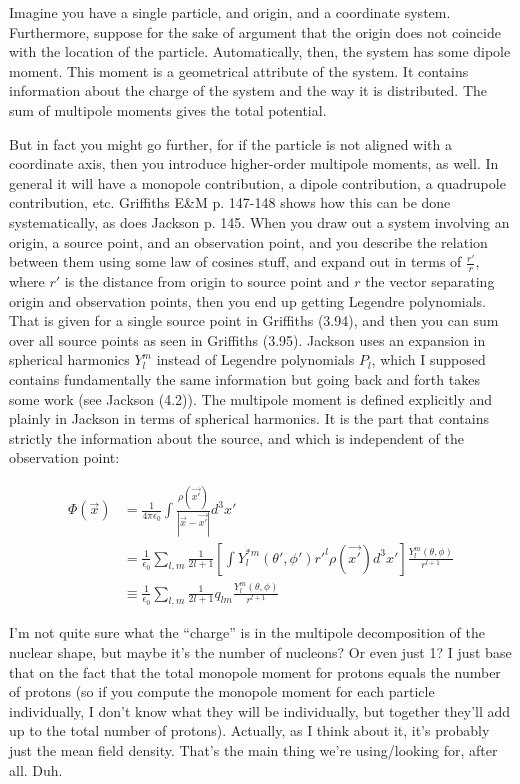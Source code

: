 Imagine you have a single particle, and origin, and a coordinate system. Furthermore, suppose for the sake of argument that the origin does not coincide with the location of the particle. Automatically, then, the system has some dipole moment. This moment is a geometrical attribute of the system. It contains information about the charge of the system and the way it is distributed. The sum of multipole moments gives the total potential.

But in fact you might go further, for if the particle is not aligned with a coordinate axis, then you introduce higher-order multipole moments, as well. In general it will have a monopole contribution, a dipole contribution, a quadrupole contribution, etc. Griffiths E\&M p. 147-148 shows how this can be done systematically, as does Jackson p. 145. When you draw out a system involving an origin, a source point, and an observation point, and you describe the relation between them using some law of cosines stuff, and expand out in terms of $\frac{r'}{r}$, where $r'$ is the distance from origin to source point and $r$ the vector separating origin and observation points, then you end up getting Legendre polynomials. That is given for a single source point in Griffiths (3.94), and then you can sum over all source points as seen in Griffiths (3.95). Jackson uses an expansion in spherical harmonics $Y^m_l$ instead of Legendre polynomials $P_l$, which I supposed contains fundamentally the same information but going back and forth takes some work (see Jackson (4.2)). The multipole moment is defined explicitly and plainly in Jackson in terms of spherical harmonics. It is the part that contains strictly the information about the source, and which is independent of the observation point:

\begin{align*}
\Phi(\vec{x}) &= \frac{1}{4\pi\epsilon_0}\int\frac{\rho(\vec{x'})}{|\vec{x}-\vec{x'}|}d^3x' \\
&= \frac{1}{\epsilon_0}\sum_{l,m}\frac{1}{2l+1}\left[\int Y_l^{*m}(\theta',\phi')r'^l\rho(\vec{x'})d^3x'\right]\frac{Y_l^m(\theta,\phi)}{r^{l+1}} \\
&\equiv \frac{1}{\epsilon_0}\sum_{l,m}\frac{1}{2l+1}q_{lm}\frac{Y_l^m(\theta,\phi)}{r^{l+1}}
\end{align*}

\noindent I'm not quite sure what the ``charge'' is in the multipole decomposition of the nuclear shape, but maybe it's the number of nucleons? Or even just 1? I just base that on the fact that the total monopole moment for protons equals the number of protons (so if you compute the monopole moment for each particle individually, I don't know what they will be individually, but together they'll add up to the total number of protons). Actually, as I think about it, it's probably just the mean field density. That's the main thing we're using/looking for, after all. Duh.

